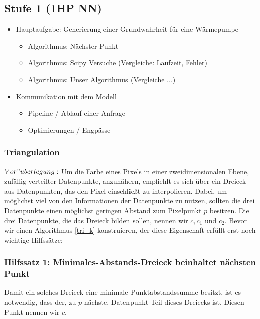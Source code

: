 \documentclass[a4paper]{extarticle}
\begin{document}
    \subsection{Stufe 1 (1HP NN)}
    \begin{itemize}
        \item Hauptaufgabe: Generierung einer Grundwahrheit für eine Wärmepumpe
        \begin{itemize}
            \item Algorithmus: Nächster Punkt
            \item Algorithmus: Scipy Versuche (Vergleiche: Laufzeit, Fehler)
            \item Algorithmus: Unser Algorithmus (Vergleiche ...)
        \end{itemize}
        \item Kommunikation mit dem Modell
        \begin{itemize}
            \item Pipeline / Ablauf einer Anfrage
            \item Optimierungen / Engpässe
        \end{itemize}
    \end{itemize}
    \subsubsection{Triangulation}
    $Vor"uberlegung:$ Um die Farbe eines Pixels in einer zweidimensionalen Ebene, zufällig verteilter
    Datenpunkte, anzunähern, empfiehlt es sich über ein Dreieck aus Datenpunkten, das den Pixel 
    einschließt zu interpolieren. Dabei, um möglichst viel von den Informationen der Datenpunkte 
    zu nutzen, sollten die drei Datenpunkte einen möglichst geringen Abstand zum Pixelpunkt $p$ 
    besitzen. Die drei Datenpunkte, die das Dreieck bilden sollen, nennen wir $c, c_1$ und $c_2$.
    Bevor wir einen Algorithmus \ref{tri_k} konstruieren, der diese Eigenschaft erfüllt erst noch 
    wichtige Hilfssätze:

    \subsubsection{Hilfssatz 1: Minimales-Abstands-Dreieck beinhaltet nächsten Punkt} \label{tri_hs1}
    Damit ein solches Dreieck eine minimale Punktabstandssumme besitzt,
    ist es notwendig, dass der, zu $p$ nächste, Datenpunkt Teil dieses Dreiecks ist. Diesen Punkt 
    nennen wir $c$.
\end{document}
